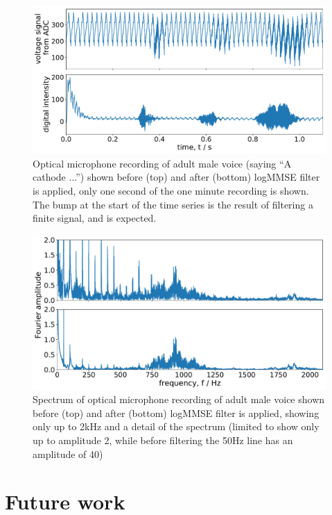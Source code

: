 \documentclass[prb,preprint]{revtex4-1}
\begin{document}
\begin{figure}%
	\includegraphics[width=\textwidth]{figures/filter_timeseries_aa_melatos-cropped.pdf}
	\caption{Optical microphone recording of adult male voice (saying ``A cathode ...'') shown before (top) and after (bottom) logMMSE filter is applied, only one second of the one minute recording is shown. The bump at the start of the time series is the result of filtering a finite signal, and is expected.}
	\label{fig:logMMSE_timeseries}
\end{figure}

\begin{figure}%
	\includegraphics[width=\textwidth]{figures/filter_spectrum_aa_melatos-cropped.pdf}
	\caption{Spectrum of optical microphone recording of adult male voice shown before (top) and after (bottom) logMMSE filter is applied, showing only up to 2kHz and a detail of the spectrum (limited to show only up to amplitude 2, while before filtering the 50Hz line has an amplitude of 40)}
	\label{fig:logMMSE_spectrum}
\end{figure}


\section{Future work}
\label{sec:future_work}
\end{document}

